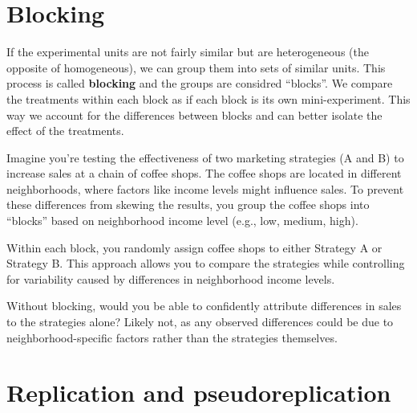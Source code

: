 \documentclass[
  letterpaper,
  DIV=11,
  numbers=noendperiod,
  oneside]{scrreprt}
\begin{document}
\section*{\texorpdfstring{\textbf{Blocking}}{Blocking}}\label{blocking}


If the experimental units are not fairly similar but are heterogeneous
(the opposite of homogeneous), we can group them into sets of similar
units. This process is called \textbf{blocking} and the groups are
considred ``blocks''. We compare the treatments within each block as if
each block is its own mini-experiment. This way we account for the
differences between blocks and can better isolate the effect of the
treatments.

\begin{tcolorbox}[enhanced jigsaw, colframe=quarto-callout-warning-color-frame, breakable, arc=.35mm, toptitle=1mm, colback=white, title={Example 2.2 EDIT THIS STILL}, opacityback=0, bottomrule=.15mm, opacitybacktitle=0.6, colbacktitle=quarto-callout-warning-color!10!white, toprule=.15mm, rightrule=.15mm, bottomtitle=1mm, leftrule=.75mm, titlerule=0mm, coltitle=black, left=2mm]

Imagine you're testing the effectiveness of two marketing strategies (A
and B) to increase sales at a chain of coffee shops. The coffee shops
are located in different neighborhoods, where factors like income levels
might influence sales. To prevent these differences from skewing the
results, you group the coffee shops into ``blocks'' based on
neighborhood income level (e.g., low, medium, high).

Within each block, you randomly assign coffee shops to either Strategy A
or Strategy B. This approach allows you to compare the strategies while
controlling for variability caused by differences in neighborhood income
levels.

Without blocking, would you be able to confidently attribute differences
in sales to the strategies alone? Likely not, as any observed
differences could be due to neighborhood-specific factors rather than
the strategies themselves.

\end{tcolorbox}

\section*{\texorpdfstring{\textbf{Replication and
pseudoreplication}}{Replication and pseudoreplication}}\label{replication-and-pseudoreplication}
\end{document}
